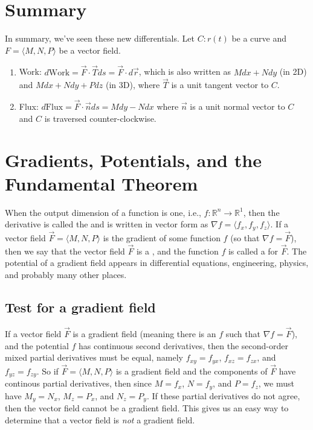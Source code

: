\section{Summary}
\label{sec:summary}

In summary, we've seen these new differentials.    Let $C\colon r(t)$ be a curve and
$F=\langle M,N,P\rangle$ be a vector field.
\begin{enumerate}
\item Work: $d\text{Work} = \vec F\cdot \vec T ds = \vec F\cdot d\vec r$, which is also written as $Mdx+Ndy$ (in 2D) and $Mdx+Ndy+Pdz$ (in 3D), where $\vec T$ is
a unit tangent vector to $C$.
\item Flux: $d\text{Flux} = \vec F\cdot \vec n ds = Mdy-Ndx$ where $\vec
n$ is a unit normal vector to $C$ and $C$ is traversed counter-clockwise.
\end{enumerate}

\section{Gradients, Potentials, and the Fundamental Theorem}

When the output dimension of a function is one, {i.e.,
  $f\colon{\mathbb{R}}^n\to {\mathbb{R}}^1$}, then the derivative is called
the  and is written in vector form as {$\nabla f = \langle f_x,f_y,f_z\rangle$}.
If a vector field {$\vec F = \langle M,N,P\rangle$} is the gradient of some
function {$f$} (so that {$\nabla f= \vec F$}), then we say that the vector
field {$\vec F$} is a , and the function {$f$} is called
a  for {$\vec F$}. The potential of a gradient field appears
in differential equations, engineering, physics, and probably many
other places.

\subsection{Test for a gradient field}

If a vector field $\vec F$ is a gradient field (meaning there is an
$f$ such that $\nabla f=\vec F$), and the potential $f$ has continuous
second derivatives, then the second-order mixed partial derivatives
must be equal, namely $f_{xy}=f_{yx}$, $f_{xz}=f_{zx}$, and
$f_{yz}=f_{zy}$. So if $\vec F = \langle M,N,P\rangle$ is a gradient field and the
components of $\vec F$ have continous partial derivatives, then since
$M=f_x$, $N=f_y$, and $P=f_z$, we must have $M_y=N_x$, $M_z=P_x$, and
$N_z=P_y$. If these partial derivatives do not agree, then the vector
field cannot be a gradient field.  This gives us an easy way to
determine that a vector field is \emph{not} a gradient field.

